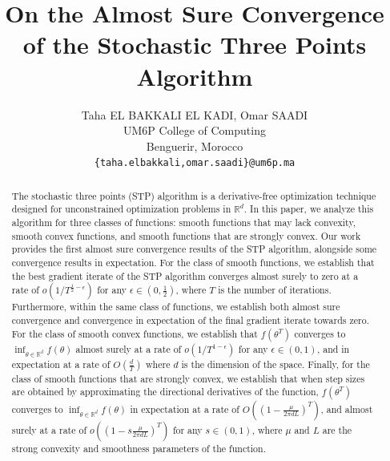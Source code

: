 \documentclass{article} %
\title{On the Almost Sure Convergence of the Stochastic Three Points Algorithm}
\author{Taha EL BAKKALI EL KADI, Omar SAADI \\
UM6P College of Computing\\
Benguerir, Morocco \\
\texttt{\{taha.elbakkali,omar.saadi\}@um6p.ma} 
}
\begin{document}
\maketitle


\begin{abstract}
 The stochastic three points (STP) algorithm is a derivative-free optimization technique designed for unconstrained optimization problems in $\mathbb{R}^d$. In this paper, we analyze this algorithm for three classes of functions: smooth functions that may lack convexity, smooth convex functions, and smooth functions that are strongly convex. Our work provides the first almost sure convergence results of the STP algorithm, alongside some convergence results in expectation.
For the class of smooth functions, we establish that the best gradient iterate of the STP algorithm converges almost surely to zero at a rate of $o(1/{T^{\frac{1}{2}-\epsilon}})$ for any $\epsilon\in (0,\frac{1}{2})$, where $T$ is the number of iterations. Furthermore, within the same class of functions, we establish both almost sure convergence and convergence in expectation of the final gradient iterate towards zero.
For the class of smooth convex functions, we establish that $f(\theta^T)$ converges to $\inf_{\theta \in \mathbb{R}^d} f(\theta)$ almost surely at a rate of $o(1/{T^{1-\epsilon}})$ for any $\epsilon\in (0,1)$, and in expectation at a rate of $O(\frac{d}{T})$ where $d$ is the dimension of the space.
Finally, for the class of smooth functions that are strongly convex, we establish that when step sizes are obtained by approximating the directional derivatives of the function, $f(\theta^T)$ converges to $\inf_{\theta \in \mathbb{R}^d} f(\theta)$ in expectation at a rate of $O((1-\frac{\mu}{2\pi dL})^T)$, and almost surely at a rate of $o((1-s\frac{\mu}{2\pi dL})^T)$ for any $s\in (0,1)$,  where $\mu$ and $L$
are  the strong convexity and smoothness parameters of the function.
\end{abstract}
\end{document}
